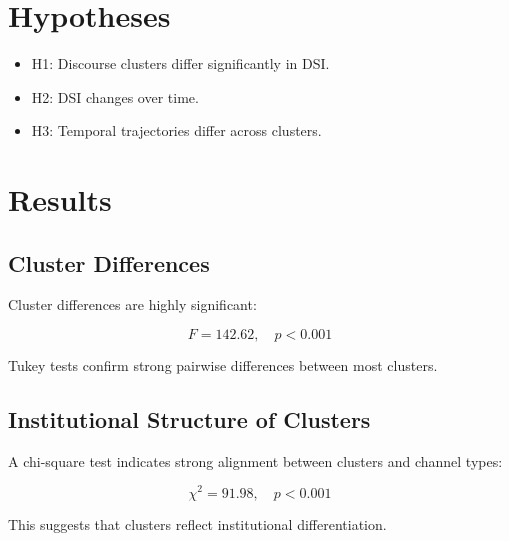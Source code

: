 \documentclass[11pt]{article}
\begin{document}
\section{Hypotheses}



\begin{itemize}

\item H1: Discourse clusters differ significantly in DSI.

\item H2: DSI changes over time.

\item H3: Temporal trajectories differ across clusters.

\end{itemize}



\section{Results}



\subsection{Cluster Differences}



Cluster differences are highly significant:



\[

F = 142.62,\quad p < 0.001

\]



Tukey tests confirm strong pairwise differences between most clusters.



\subsection{Institutional Structure of Clusters}



A chi-square test indicates strong alignment between clusters and channel types:



\[

\chi^2 = 91.98,\quad p < 0.001

\]



This suggests that clusters reflect institutional differentiation.
\end{document}
